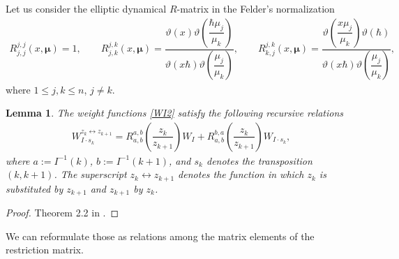 \documentclass[10pt,a4paper]{amsart}
\def\mub{{\boldsymbol\mu}}
\let\thi\vartheta
\numberwithin{equation}{section}
\newtheorem{Lemma}[Theorem]{Lemma}
\begin{document}
Let us consider the elliptic dynamical $R$-matrix in the Felder's normalization
\begin{gather*}
R^{j,j}_{j,j}(x,\mub)=1, \qquad R^{j,k}_{j,k}(x,\mub)=\dfrac{\thi(x) \thi \left( \dfrac{\hbar \mu_j}{\mu_{k}} \right)}{\thi(x \hbar) \thi \left( \dfrac{\mu_j}{\mu_k} \right)}, \qquad R^{j,k}_{k,j}(x,\mub)=\dfrac{\thi \left( \dfrac{x \mu_j}{\mu_k} \right) \thi(\hbar)}{\thi(x \hbar) \thi \left( \dfrac{\mu_j}{\mu_k} \right)} ,
\end{gather*}
where $1\leq j, k\leq n$, $j\neq k$.

\begin{Lemma}The weight functions \eqref{WI2} satisfy the following recursive relations
\begin{gather*}
W_{I \cdot s_{k}}^{z_k\leftrightarrow z_{k+1}}=R^{a,b}_{a,b} \left( \dfrac{z_k}{z_{k+1}} \right) W_{I}+R^{b,a}_{a,b} \left( \dfrac{z_k}{z_{k+1}} \right) W_{I \cdot s_k},
\end{gather*}
where $a := I^{-1} (k)$, $b := I^{-1} (k+1)$, and $s_k$ denotes the transposition $(k,k+1)$. The superscript $z_k\leftrightarrow z_{k+1}$ denotes the function in which $z_k$ is substituted by $z_{k+1}$ and $z_{k+1}$ by $z_{k}$.
\end{Lemma}
\begin{proof}Theorem 2.2 in \cite{RTV}.
\end{proof}

We can reformulate those as relations among the matrix elements of the restriction matrix.
\end{document}
